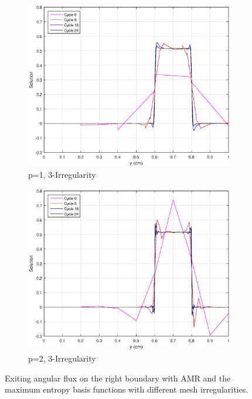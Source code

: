 \begin{figure}
{}
\vspace{2.5mm}
{
	\begin{subfigure}[b]{0.45\textwidth}
		\centering
		\label{subfig::SL_uniform_ef_me1_irr3}
		\includegraphics[width=\textwidth]{figures/sec_BF/SL_AMR_ME_k1_Irr3.eps}
		\caption{p=1, 3-Irregularity}
	\end{subfigure}
	\hfill
	\begin{subfigure}[b]{0.45\textwidth}
		\centering
		\label{subfig::SL_uniform_ef_me2_irr3}
		\includegraphics[width=\textwidth]{figures/sec_BF/SL_AMR_ME_k2_Irr3.eps}
		\caption{p=2, 3-Irregularity}
	\end{subfigure}
}
\caption{Exiting angular flux on the right boundary with AMR and the maximum entropy basis functions with different mesh irregularities.}
\label{fig::BF_Results_SL_AMR_ME_exit_flux}
\end{figure}

